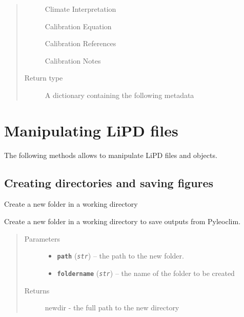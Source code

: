\documentclass[letterpaper,10pt,english]{sphinxmanual}
\begin{document}
\begin{fulllineitems}
\begin{fulllineitems}
\begin{quote}
\begin{description}
Climate Interpretation

Calibration Equation

Calibration References

Calibration Notes


\item[{Return type}] \leavevmode
A dictionary containing the following metadata

\end{description}\end{quote}

\end{fulllineitems}


\end{fulllineitems}



\chapter{Manipulating LiPD files}
\label{LIPDutils::doc}\label{LIPDutils:manipulating-lipd-files}
The following methods allows to manipulate LiPD files and objects.


\section{Creating directories and saving figures}
\label{LIPDutils:creating-directories-and-saving-figures}

\begin{fulllineitems}
\label{LIPDutils:pyleoclim.createDir}
Create a new folder in a working directory

Create a new folder in a working directory to save outputs from Pyleoclim.
\begin{quote}\begin{description}
\item[{Parameters}] \leavevmode\begin{itemize}
\item {} 
\textbf{\texttt{path}} (\emph{\texttt{str}}) -- the path to the new folder.

\item {} 
\textbf{\texttt{foldername}} (\emph{\texttt{str}}) -- the name of the folder to be created

\end{itemize}

\item[{Returns}] \leavevmode
newdir - the full path to the new directory

\end{description}\end{quote}

\end{fulllineitems}
\end{document}
